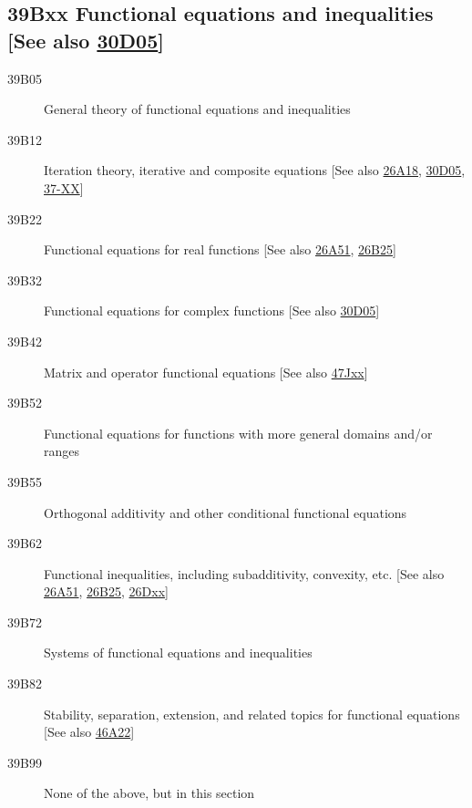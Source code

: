 \subsection*{39Bxx  Functional equations and inequalities [See also \hyperref[30D05]{30D05}]}\label{39Bxx}
\begin{description}  
\item [39B05]\label{39B05} General theory of functional equations and inequalities
\item [39B12]\label{39B12} Iteration theory, iterative and composite equations [See also \hyperref[26A18]{26A18}, \hyperref[30D05]{30D05}, \hyperref[37-XX]{37-XX}]
\item [39B22]\label{39B22} Functional equations for real functions [See also \hyperref[26A51]{26A51}, \hyperref[26B25]{26B25}]
\item [39B32]\label{39B32} Functional equations for complex functions [See also \hyperref[30D05]{30D05}]
\item [39B42]\label{39B42} Matrix and operator functional equations [See also \hyperref[47Jxx]{47Jxx}]
\item [39B52]\label{39B52} Functional equations for functions with more general domains and/or ranges
\item [39B55]\label{39B55} Orthogonal additivity and other conditional functional equations
\item [39B62]\label{39B62} Functional inequalities, including subadditivity, convexity, etc. [See also \hyperref[26A51]{26A51}, \hyperref[26B25]{26B25}, \hyperref[26Dxx]{26Dxx}]
\item [39B72]\label{39B72} Systems of functional equations and inequalities
\item [39B82]\label{39B82} Stability, separation, extension, and related topics for functional equations [See also \hyperref[46A22]{46A22}]
\item [39B99]\label{39B99} None of the above, but in this section
\end{description}
